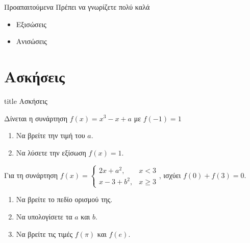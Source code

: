 \documentclass{presentation}
\begin{document}
\begin{frame}{Προαπαιτούμενα}
  Πρέπει να γνωρίζετε πολύ καλά
  \begin{itemize}
    \item Εξισώσεις
    \item Ανισώσεις
  \end{itemize}
\end{frame}


\section{Ασκήσεις}

\begin{frame}[noframenumbering]
  \vfill
  \centering
  \begin{beamercolorbox}[sep=8pt,center,shadow=true,rounded=true]{title}
    Ασκήσεις
  \end{beamercolorbox}
  \vfill
\end{frame}

\begin{askisi}
  Δίνεται η συνάρτηση $f(x)=x^3-x+a$ με $f(-1)=1$
  \begin{enumerate}
    \item<1-> Να βρείτε την τιμή του $a$.
    \item<2-> Να λύσετε την εξίσωση $f(x)=1$.
  \end{enumerate}
\end{askisi}

\begin{askisi}
  Για τη συνάρτηση $f(x)=\begin{cases}
      2x+a^2,  & x<3   \\
      x-3+b^2, & x\ge3
    \end{cases}$, ισχύει $f(0)+f(3)=0$.
  \begin{enumerate}
    \item<1-> Να βρείτε το πεδίο ορισμού της.
    \item<2-> Να υπολογίσετε τα $a$ και $b$.
    \item<3-> Να βρείτε τις τιμές $f(\pi)$ και $f(e)$.
  \end{enumerate}
\end{askisi}
\end{document}
